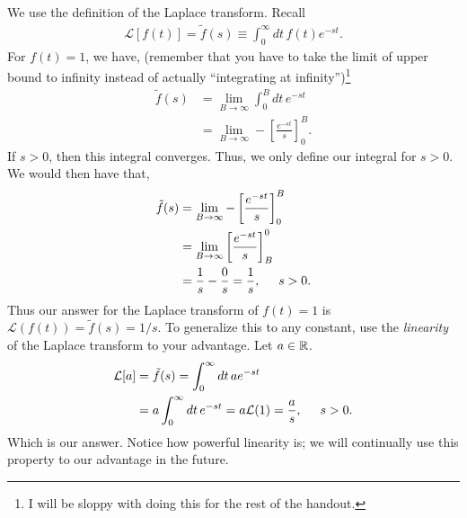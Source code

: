 \documentclass[11pt]{article}
\theoremstyle{mystyle}
\begin{document}
    \begin{pssolution}{}{}
        We use the definition of the Laplace transform.
        Recall
        \begin{align*}
            \mathcal{L}[f(t)] = \tilde{f}(s) \equiv \int_0^\infty dt \, f(t) e^{-st}.
        \end{align*}
        For $f(t) = 1$, we have, (remember that you have to take the limit
        of upper bound to infinity instead of actually ``integrating
        at infinity'')\footnote{I will be sloppy with doing this 
        for the rest of the handout.}
        \begin{align*}
            \tilde{f}(s) & = \lim_{B \to \infty} \int_0^B dt \, e^{-st}\\
            & = \lim_{B \to \infty} - \left[ \frac{e^{-st}}{s} \right]_0^B.
        \end{align*}
        If $s > 0$, then this integral converges. Thus,
        we only define our integral for $s > 0$.
        We would then have that,
        \begin{align*}
            \tilde{f}(s) & = \lim_{B \to \infty} - \left[ \frac{e^{-st}}{s}\right]_0^B\\
            & = \lim_{B \to \infty} \left[ \frac{e^{-st}}{s} \right]_B^0\\
            & = \frac{1}{s} - \frac{0}{s} = \frac{1}{s}, \hspace{0.5cm} s > 0.
        \end{align*}
        Thus our answer for the Laplace transform of $f(t) = 1$
        is $\mathcal{L}(f(t)) = \tilde{f}(s) = 1/s$.
        To generalize this to any constant, use the
        \emph{linearity} of the Laplace transform to your
        advantage. Let $a \in \mathbb{R}$.
        \begin{align*}
            \mathcal{L}[a] & = \tilde{f}(s) = \int_0^\infty dt \, a e^{-st}\\
            & =  a \int_0^\infty dt \, e^{-st} = a\mathcal{L}(1) = \frac{a}{s}, \hspace{0.5cm} s > 0.
        \end{align*}
        Which is our answer. Notice how powerful linearity is; we will continually
        use this property to our advantage in the future.
    \end{pssolution}
\end{document}
